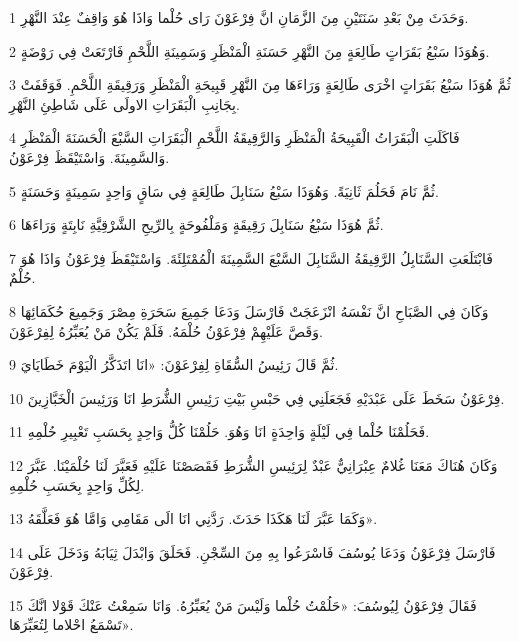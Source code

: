\par 1 وَحَدَثَ مِنْ بَعْدِ سَنَتَيْنِ مِنَ الزَّمَانِ انَّ فِرْعَوْنَ رَاى حُلْما وَاذَا هُوَ وَاقِفٌ عِنْدَ النَّهْرِ.
\par 2 وَهُوَذَا سَبْعُ بَقَرَاتٍ طَالِعَةٍ مِنَ النَّهْرِ حَسَنَةِ الْمَنْظَرِ وَسَمِينَةِ اللَّحْمِ فَارْتَعَتْ فِي رَوْضَةٍ.
\par 3 ثُمَّ هُوَذَا سَبْعُ بَقَرَاتٍ اخْرَى طَالِعَةٍ وَرَاءَهَا مِنَ النَّهْرِ قَبِيحَةِ الْمَنْظَرِ وَرَقِيقَةِ اللَّحْمِ. فَوَقَفَتْ بِجَانِبِ الْبَقَرَاتِ الاولَى عَلَى شَاطِئِ النَّهْرِ.
\par 4 فَاكَلَتِ الْبَقَرَاتُ الْقَبِيحَةُ الْمَنْظَرِ وَالرَّقِيقَةُ اللَّحْمِ الْبَقَرَاتِ السَّبْعَ الْحَسَنَةَ الْمَنْظَرِ وَالسَّمِينَةَ. وَاسْتَيْقَظَ فِرْعَوْنُ.
\par 5 ثُمَّ نَامَ فَحَلُمَ ثَانِيَةً. وَهُوَذَا سَبْعُ سَنَابِلَ طَالِعَةٍ فِي سَاقٍ وَاحِدٍ سَمِينَةٍ وَحَسَنَةٍ.
\par 6 ثُمَّ هُوَذَا سَبْعُ سَنَابِلَ رَقِيقَةٍ وَمَلْفُوحَةٍ بِالرِّيحِ الشَّرْقِيَّةِ نَابِتَةٍ وَرَاءَهَا.
\par 7 فَابْتَلَعَتِ السَّنَابِلُ الرَّقِيقَةُ السَّنَابِلَ السَّبْعَ السَّمِينَةَ الْمُمْتَلِئَةَ. وَاسْتَيْقَظَ فِرْعَوْنُ وَاذَا هُوَ حُلْمٌ.
\par 8 وَكَانَ فِي الصَّبَاحِ انَّ نَفْسَهُ انْزَعَجَتْ فَارْسَلَ وَدَعَا جَمِيعَ سَحَرَةِ مِصْرَ وَجَمِيعَ حُكَمَائِهَا وَقَصَّ عَلَيْهِمْ فِرْعَوْنُ حُلْمَهُ. فَلَمْ يَكُنْ مَنْ يُعَبِّرُهُ لِفِرْعَوْنَ.
\par 9 ثُمَّ قَالَ رَئِيسُ السُّقَاةِ لِفِرْعَوْنَ: «انَا اتَذَكَّرُ الْيَوْمَ خَطَايَايَ.
\par 10 فِرْعَوْنُ سَخَطَ عَلَى عَبْدَيْهِ فَجَعَلَنِي فِي حَبْسِ بَيْتِ رَئِيسِ الشُّرَطِ انَا وَرَئِيسَ الْخَبَّازِينَ.
\par 11 فَحَلُمْنَا حُلْما فِي لَيْلَةٍ وَاحِدَةٍ انَا وَهُوَ. حَلُمْنَا كُلُّ وَاحِدٍ بِحَسَبِ تَعْبِيرِ حُلْمِهِ.
\par 12 وَكَانَ هُنَاكَ مَعَنَا غُلامٌ عِبْرَانِيٌّ عَبْدٌ لِرَئِيسِ الشُّرَطِ فَقَصَصْنَا عَلَيْهِ فَعَبَّرَ لَنَا حُلْمَيْنَا. عَبَّرَ لِكُلِّ وَاحِدٍ بِحَسَبِ حُلْمِهِ.
\par 13 وَكَمَا عَبَّرَ لَنَا هَكَذَا حَدَثَ. رَدَّنِي انَا الَى مَقَامِي وَامَّا هُوَ فَعَلَّقَهُ».
\par 14 فَارْسَلَ فِرْعَوْنُ وَدَعَا يُوسُفَ فَاسْرَعُوا بِهِ مِنَ السِّجْنِ. فَحَلَقَ وَابْدَلَ ثِيَابَهُ وَدَخَلَ عَلَى فِرْعَوْنَ.
\par 15 فَقَالَ فِرْعَوْنُ لِيُوسُفَ: «حَلُمْتُ حُلْما وَلَيْسَ مَنْ يُعَبِّرُهُ. وَانَا سَمِعْتُ عَنْكَ قَوْلا انَّكَ تَسْمَعُ احْلاما لِتُعَبِّرَهَا».
